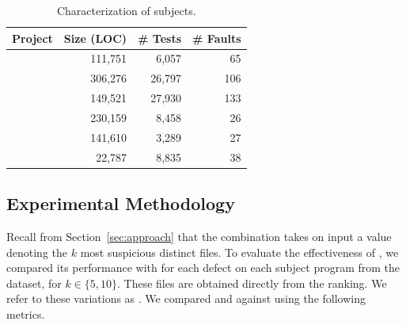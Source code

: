\documentclass{article}
\begin{document}
\newcommand{\cgray}[1]{\cellcolor{gray!25}#1}
\begin{table}[h]
  \centering
  \setlength{\tabcolsep}{4pt}
    \begin{tabular}{lrrr}
      \toprule
      Project            & Size (LOC) & \# Tests & \# Faults \\ %
      \midrule
      \lang{}            & 111,751  & 6,057 & 65       \\   %
      \cmath{}           & 306,276  & 26,797 & 106     \\   %
      \closure{}         & 149,521  & 27,930  & 133     \\   %
      \chart{}           & 230,159  & 8,458 & 26      \\  %
      \jtime{}           & 141,610  & 3,289 & 27       \\   %
      \mockito{}         & 22,787  & 8,835 & 38    \\     %
      \bottomrule
  \end{tabular}
\caption {Characterization of \dfj{} subjects.}
\label{tab:df4j}
\end{table}
\normalsize


\subsection{Experimental Methodology}\label{sec:methodology}


Recall from Section~\ref{sec:approach} that the \comb{} combination
takes on input a value denoting the $k$ most suspicious distinct
files. To evaluate the effectiveness of \comb{}, we compared its
performance with \sfl{} for each defect on each subject program from
the dataset, for $k\in\{5,10\}$. These files are obtained directly
from the ranking. We refer to these variations as . We
compared  and  against \sfl{} using the
following metrics.
\end{document}
